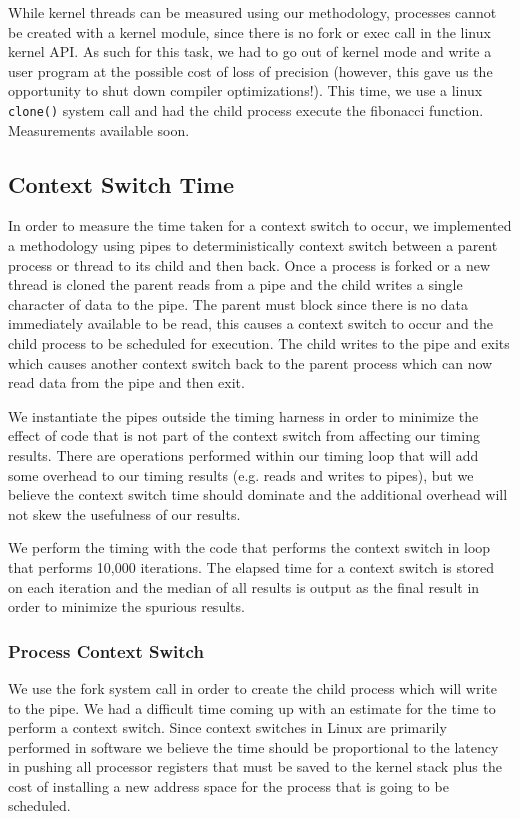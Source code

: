 While kernel threads can be measured using our methodology, processes cannot be
created with a kernel module, since there is no fork or exec call in the linux
kernel API. As such for this task, we had to go out of kernel mode and write a
user program at the possible cost of loss of precision (however, this gave us
the opportunity to shut down compiler optimizations!). This time, we use a linux
\texttt{clone()} system call and had the child process execute the fibonacci
function. Measurements available soon.

\subsection{Context Switch Time} 

In order to measure the time taken for a context switch to occur, we implemented
a methodology using pipes to deterministically context switch between a parent
process or thread to its child and then back. Once a process is forked or a new
thread is cloned the parent reads from a pipe and the child writes a single
character of data to the pipe. The parent must block since there is no data
immediately available to be read, this causes a context switch to occur and the
child process to be scheduled for execution. The child writes to the pipe and
exits which causes another context switch back to the parent process which can
now read data from the pipe and then exit. 

We instantiate the pipes outside the timing harness in order to minimize the effect
of code that is not part of the context switch from affecting our timing
results. There are operations performed within our timing loop that will add
some overhead to our timing results (e.g. reads and writes to pipes), but we
believe the context switch time should dominate and the additional overhead will
not skew the usefulness of our results.

We perform the timing with the code that performs the context switch in loop
that performs 10,000 iterations. The elapsed time for a context switch is stored
on each iteration and the median of all results is output as the final result in
order to minimize the spurious results.

\subsubsection{Process Context Switch} 
We use the fork system call in order to create the child process which will
write to the pipe. We had a difficult time coming up with an estimate for the
time to perform a context switch. Since context switches in Linux are primarily
performed in software we believe the time should be proportional to the latency
in pushing all processor registers that must be saved to the kernel stack plus
the cost of installing a new address space for the process that is going to be
scheduled.

